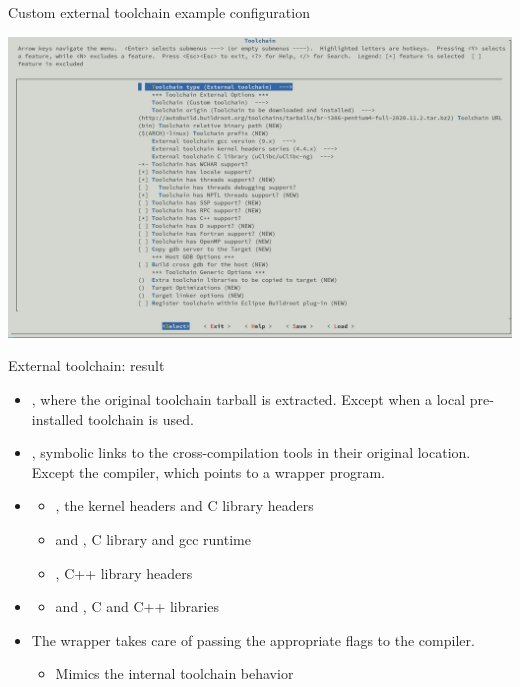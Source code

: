 \begin{frame}{Custom external toolchain example configuration}
  \begin{center}
    \includegraphics[height=0.8\textheight]{slides/buildroot-toolchain/external-toolchain-config.png}
  \end{center}
\end{frame}

\begin{frame}{External toolchain: result}
  \begin{itemize}
  \item {}, where the original toolchain
    tarball is extracted. Except when a local pre-installed toolchain
    is used.
  \item {}, symbolic links to the
    cross-compilation tools in their original location. Except the
    compiler, which points to a wrapper program.
  \item {}
    \begin{itemize}
    \item {}, the kernel headers and C
      library headers
    \item {} and , C library and
      gcc runtime
    \item {}, C++ library headers
    \end{itemize}
  \item {}
    \begin{itemize}
    \item {} and , C and C++ libraries
    \end{itemize}
  \item The wrapper takes care of passing the appropriate flags to the
    compiler.
    \begin{itemize}
    \item Mimics the internal toolchain behavior
    \end{itemize}
  \end{itemize}
\end{frame}

